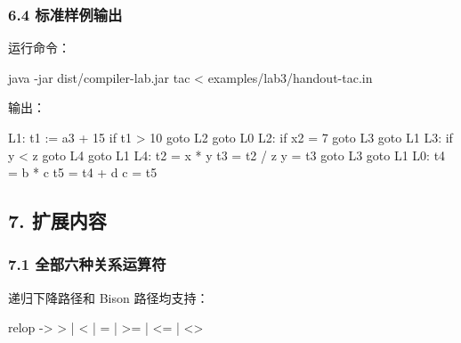 \documentclass[
  a4paper,
  fontset=none,
]{ctexart}
\newenvironment{Shaded}{}{}
\newcommand{\AttributeTok}[1]{\textcolor[rgb]{0.49,0.56,0.16}{#1}}
\newcommand{\ExtensionTok}[1]{#1}
\newcommand{\NormalTok}[1]{#1}
\newcommand{\OperatorTok}[1]{\textcolor[rgb]{0.40,0.40,0.40}{#1}}
\begin{document}
\hypertarget{ux6807ux51c6ux6837ux4f8bux8f93ux51fa}{%
\subsubsection{6.4
标准样例输出}\label{ux6807ux51c6ux6837ux4f8bux8f93ux51fa}}

运行命令：

\begin{Shaded}
\begin{Highlighting}[]
\ExtensionTok{java} \AttributeTok{{-}jar}\NormalTok{ dist/compiler{-}lab.jar tac }\OperatorTok{\textless{}}\NormalTok{ examples/lab3/handout{-}tac.in}
\end{Highlighting}
\end{Shaded}

输出：

\begin{Shaded}
\begin{Highlighting}[]
\NormalTok{L1: t1 := a3 + 15}
\NormalTok{if t1 \textgreater{} 10 goto L2}
\NormalTok{goto L0}
\NormalTok{L2: if x2 = 7 goto L3}
\NormalTok{goto L1}
\NormalTok{L3: if y \textless{} z goto L4}
\NormalTok{goto L1}
\NormalTok{L4: t2 = x * y}
\NormalTok{t3 = t2 / z}
\NormalTok{y = t3}
\NormalTok{goto L3}
\NormalTok{goto L1}
\NormalTok{L0: t4 = b * c}
\NormalTok{t5 = t4 + d}
\NormalTok{c = t5}
\end{Highlighting}
\end{Shaded}

\hypertarget{ux6269ux5c55ux5185ux5bb9}{%
\subsection{7. 扩展内容}\label{ux6269ux5c55ux5185ux5bb9}}

\hypertarget{ux5168ux90e8ux516dux79cdux5173ux7cfbux8fd0ux7b97ux7b26}{%
\subsubsection{7.1
全部六种关系运算符}\label{ux5168ux90e8ux516dux79cdux5173ux7cfbux8fd0ux7b97ux7b26}}

递归下降路径和 Bison 路径均支持：

\begin{Shaded}
\begin{Highlighting}[]
\NormalTok{relop {-}\textgreater{} \textgreater{} | \textless{} | = | \textgreater{}= | \textless{}= | \textless{}\textgreater{}}
\end{Highlighting}
\end{Shaded}
\end{document}
